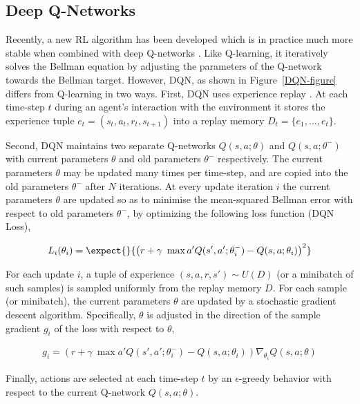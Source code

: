 \subsection{Deep Q-Networks}
Recently, a new RL algorithm has been developed which is in practice much more stable when combined with deep Q-networks \cite{mnih2013atari,mnih-dqn-2015}. Like Q-learning, it iteratively solves the Bellman equation by adjusting the parameters of the Q-network towards the Bellman target. However, DQN, as shown in Figure~\ref{DQN-figure} differs from Q-learning in two ways. First, DQN uses experience replay \cite{lin1993reinforcement}. At each time-step $t$ during an agent's interaction with the environment it stores the experience tuple $e_t = (s_t, a_t, r_t, s_{t+1})$ into a replay memory $D_t = \{e_1, ..., e_t\}$. 

Second, DQN maintains two separate Q-networks $Q(s,a; \theta)$ and $Q(s,a; \theta^-)$ with current parameters $\theta$ and old parameters $\theta^-$ respectively. The current parameters $\theta$ may be updated many times per time-step, and are copied into the old parameters $\theta^-$ after $N$ iterations. At every update iteration $i$ the current parameters $\theta$ are updated so as to minimise the mean-squared Bellman error with respect to old parameters $\theta^-$, by optimizing the following loss function (DQN Loss),
%
\begin{small}
\begin{align}
L_i(\theta_i) = \expect{}{\left( r + \gamma \ \max{a'} Q(s', a'; \theta_i^-) - Q(s, a; \theta_i) \right)^2}
\end{align}
\end{small}
%
For each update $i$, a tuple of experience $(s,a,r,s') \sim U(D)$ (or a minibatch of such samples) is sampled uniformly from the replay memory $D$. For each sample (or minibatch), the current parameters $\theta$ are updated by a stochastic gradient descent algorithm. Specifically, $\theta$ is adjusted in the direction of the sample gradient $g_i$ of the loss with respect to $\theta$,
%
\begin{small}
\begin{align}
g_i = \left( r + \gamma \ \max{a'} Q(s', a'; \theta_i^-) - Q(s, a; \theta_i) \right) \nabla_{\theta_i} Q(s,a; \theta)
\label{eqn:dqngrad}
\end{align}
\end{small}
%
Finally, actions are selected at each time-step $t$ by an $\epsilon$-greedy behavior with respect to the current Q-network $Q(s,a;\theta)$.
